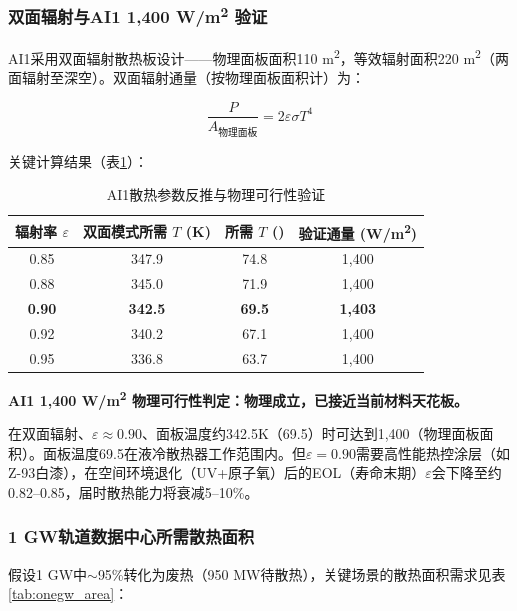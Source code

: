 \subsubsection{双面辐射与AI1 1,400 W/m\textsuperscript{2} 验证}

AI1采用双面辐射散热板设计——物理面板面积110 m\textsuperscript{2}，等效辐射面积220 m\textsuperscript{2}（两面辐射至深空）。双面辐射通量（按物理面板面积计）为：

\begin{equation}
\frac{P}{A_{\text{物理面板}}} = 2\varepsilon\sigma T^{4}
\label{eq:sb_double}
\end{equation}

关键计算结果（表\ref{tab:ai1_verify}）：

\begin{table}[H]
\centering
\caption{AI1散热参数反推与物理可行性验证}
\label{tab:ai1_verify}
\begin{tabular}{cccc}
\toprule
\textbf{辐射率 $\varepsilon$} & \textbf{双面模式所需 $T$ (K)} & \textbf{所需 $T$ (\unitC{})} & \textbf{验证通量 (W/m\textsuperscript{2})} \\
\midrule
0.85 & 347.9 & 74.8 & 1,400 \\
0.88 & 345.0 & 71.9 & 1,400 \\
\textbf{0.90} & \textbf{342.5} & \textbf{69.5} & \textbf{1,403} \\
0.92 & 340.2 & 67.1 & 1,400 \\
0.95 & 336.8 & 63.7 & 1,400 \\
\bottomrule
\end{tabular}
\end{table}

\textbf{AI1 1,400 W/m\textsuperscript{2} 物理可行性判定：物理成立，已接近当前材料天花板。}

在双面辐射、$\varepsilon\approx0.90$、面板温度约342.5K（69.5\unitC{}）时可达到1,400\unitWpm{}（物理面板面积）。面板温度69.5\unitC{}在液冷散热器工作范围内。但$\varepsilon=0.90$需要高性能热控涂层（如Z-93白漆），在空间环境退化（UV+原子氧）后的EOL（寿命末期）$\varepsilon$会下降至约0.82--0.85，届时散热能力将衰减5--10\%\cite{nasa2024sst,nasa1993thermal}。

\subsubsection{1 GW轨道数据中心所需散热面积}

假设1 GW中$\sim$95\%转化为废热（950 MW待散热），关键场景的散热面积需求见表\ref{tab:onegw_area}：

